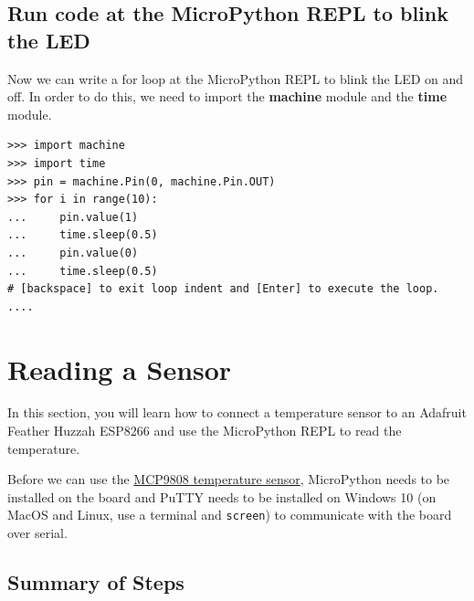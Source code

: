 \documentclass{book}
\begin{document}
    
        \subsection{Run code at the MicroPython REPL to blink the
LED}\label{run-code-at-the-micropython-repl-to-blink-the-led}
    




    
        Now we can write a for loop at the MicroPython REPL to blink the LED on
and off. In order to do this, we need to import the \textbf{machine}
module and the \textbf{time} module.
    




    
        \begin{lstlisting}
>>> import machine
>>> import time
>>> pin = machine.Pin(0, machine.Pin.OUT)
>>> for i in range(10):
...     pin.value(1)
...     time.sleep(0.5)
...     pin.value(0)
...     time.sleep(0.5)
# [backspace] to exit loop indent and [Enter] to execute the loop.
.... 
\end{lstlisting}
    




    
        \section{Reading a Sensor}\label{reading-a-sensor}
    




    
        In this section, you will learn how to connect a temperature sensor to
an Adafruit Feather Huzzah ESP8266 and use the MicroPython REPL to read
the temperature.

Before we can use the
\href{https://www.adafruit.com/product/1782}{MCP9808 temperature
sensor}, MicroPython needs to be installed on the board and PuTTY needs
to be installed on Windows 10 (on MacOS and Linux, use a terminal and
\lstinline!screen!) to communicate with the board over serial.
    




    
        \subsection{Summary of Steps}\label{summary-of-steps}
    
\end{document}
